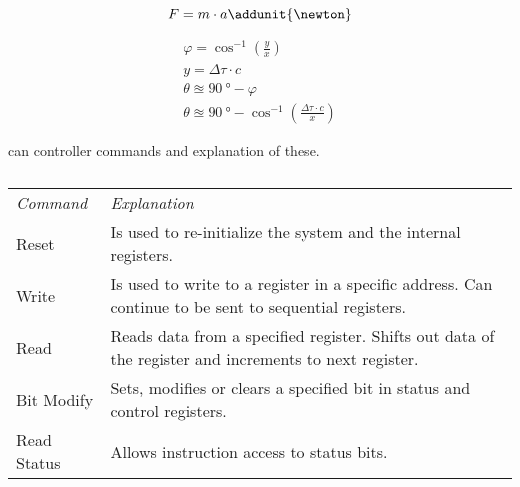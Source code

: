 \begin{equation}
F = m \cdot a \addunit{\newton}
\end{equation}
\startexplain
\stopexplain

\begin{subequations} \label{eq:tech_ToA}
	\begin{align}
		\varphi = \cos^{-1} \left( \frac{y}{x} \right) \\
		y = \Delta \tau \cdot c \\
		\theta \approxeq \SI{90}{\degree} - \varphi \\
		\theta \approxeq \SI{90}{\degree} - \cos^{-1} \left( \frac{ \Delta\tau \cdot c}{x} \right)
	\end{align}
\end{subequations}







\begin{table}[h]
	\centering
	\caption{\gls{can} controller commands and explanation of these.}
	
	\begin{tabularx}{\textwidth}{lX}
		\textit{Command}		&	\textit{Explanation} \\ \rowcolor{lightGrey} \toprule
		Reset					&	Is used to re-initialize the system and the internal registers.\\
		Write					&	Is used to write to a register in a specific address. Can continue to be sent to sequential registers.\\ \rowcolor{lightGrey}
		Read					&	Reads data from a specified register. Shifts out data of the register and increments to next register.\\
		Bit Modify				&	Sets, modifies or clears a specified bit in status and control registers.\\ \rowcolor{lightGrey}
		Read Status				&	Allows instruction access to status bits.\\
	\end{tabularx}
	\caption*{\citep{MCP2510}}
\end{table}\label{tab:mcp_cmd_expl}





